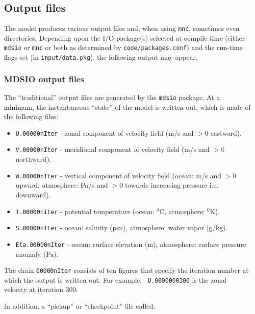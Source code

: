 \subsection{Output files}

The model produces various output files and, when using \texttt{mnc},
sometimes even directories.  Depending upon the I/O package(s)
selected at compile time (either \texttt{mdsio} or \texttt{mnc} or
both as determined by \texttt{code/packages.conf}) and the run-time
flags set (in \texttt{input/data.pkg}), the following output may
appear.


\subsubsection{MDSIO output files}

The ``traditional'' output files are generated by the \texttt{mdsio}
package.  At a minimum, the instantaneous ``state'' of the model is
written out, which is made of the following files:

\begin{itemize}
\item \texttt{U.00000nIter} - zonal component of velocity field (m/s and $>
0 $ eastward).

\item \texttt{V.00000nIter} - meridional component of velocity field (m/s
and $> 0$ northward).

\item \texttt{W.00000nIter} - vertical component of velocity field (ocean:
m/s and $> 0$ upward, atmosphere: Pa/s and $> 0$ towards increasing pressure
i.e. downward).

\item \texttt{T.00000nIter} - potential temperature (ocean: $^{0}$C,
atmosphere: $^{0}$K).

\item \texttt{S.00000nIter} - ocean: salinity (psu), atmosphere: water vapor
(g/kg).

\item \texttt{Eta.00000nIter} - ocean: surface elevation (m), atmosphere:
surface pressure anomaly (Pa).
\end{itemize}

The chain \texttt{00000nIter} consists of ten figures that specify the
iteration number at which the output is written out. For example, \texttt{%
U.0000000300} is the zonal velocity at iteration 300.

In addition, a ``pickup'' or ``checkpoint'' file called:

